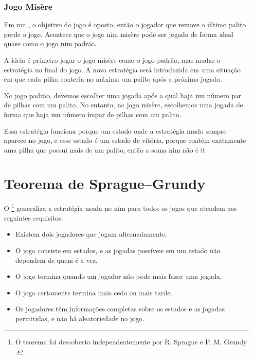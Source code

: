 \subsubsection{Jogo Misère}


Em um , o objetivo do jogo é oposto, então o jogador que remove o último palito perde o jogo. Acontece que o jogo nim misère pode ser jogado de forma ideal quase como o jogo nim padrão.

A ideia é primeiro jogar o jogo misère como o jogo padrão, mas mudar a estratégia no final do jogo. A nova estratégia será introduzida em uma situação em que cada pilha conteria no máximo um palito após a próxima jogada.

No jogo padrão, devemos escolher uma jogada após a qual haja um número par de pilhas com um palito. No entanto, no jogo misère, escolhemos uma jogada de forma que haja um número ímpar de pilhas com um palito.

Essa estratégia funciona porque um estado onde a estratégia muda sempre aparece no jogo, e esse estado é um estado de vitória, porque contém exatamente uma pilha que possui mais de um palito, então a soma nim não é 0.

\section{Teorema de Sprague–Grundy}


O \footnote{O teorema foi descoberto independentemente por R. Sprague \cite{spr35} e P. M. Grundy \cite{gru39}.} generaliza a estratégia usada no nim para todos os jogos que atendem aos seguintes requisitos:

\begin{itemize}[noitemsep]
\item Existem dois jogadores que jogam alternadamente.
\item O jogo consiste em estados, e as jogadas possíveis em um estado não dependem de quem é a vez.
\item O jogo termina quando um jogador não pode mais fazer uma jogada.
\item O jogo certamente termina mais cedo ou mais tarde.
\item Os jogadores têm informações completas sobre os estados e as jogadas permitidas, e não há aleatoriedade no jogo.
\end{itemize}

